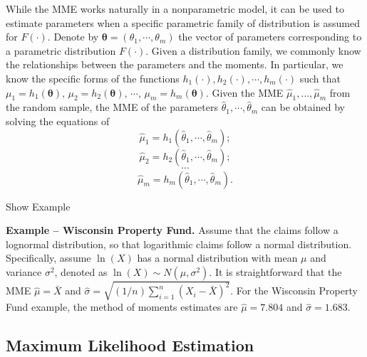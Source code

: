 \documentclass[]{book}
\theoremstyle{definition}
\theoremstyle{definition}
\theoremstyle{definition}
\theoremstyle{remark}
\begin{document}
While the MME works naturally in a nonparametric model, it can be used
to estimate parameters when a specific parametric family of distribution
is assumed for \(F(\cdot)\). Denote by
\(\boldsymbol{\theta}=(\theta_1,\cdots,\theta_m)\) the vector of
parameters corresponding to a parametric distribution \(F(\cdot)\).
Given a distribution family, we commonly know the relationships between
the parameters and the moments. In particular, we know the specific
forms of the functions \(h_1(\cdot),h_2(\cdot),\cdots,h_m(\cdot)\) such
that
\(\mu_1=h_1(\boldsymbol{\theta}),\,\mu_2=h_2(\boldsymbol{\theta}),\,\cdots,\,\mu_m=h_m(\boldsymbol{\theta})\).
Given the MME \(\hat{\mu}_1, \ldots, \hat{\mu}_m\) from the random
sample, the MME of the parameters
\(\hat{\theta}_1,\cdots,\hat{\theta}_m\) can be obtained by solving the
equations of \[\hat{\mu}_1=h_1(\hat{\theta}_1,\cdots,\hat{\theta}_m);\]
\[\hat{\mu}_2=h_2(\hat{\theta}_1,\cdots,\hat{\theta}_m);\] \[\cdots\]
\[\hat{\mu}_m=h_m(\hat{\theta}_1,\cdots,\hat{\theta}_m).\]

Show Example

\hypertarget{EXM:S1:MME}{}
\textbf{Example -- Wisconsin Property Fund.} Assume that the claims
follow a lognormal distribution, so that logarithmic claims follow a
normal distribution. Specifically, assume \(\ln(X)\) has a normal
distribution with mean \(\mu\) and variance \(\sigma^2\), denoted as
\(\ln(X) \sim N(\mu, \sigma^2)\). It is straightforward that the MME
\(\hat{\mu}=\bar{X}\) and
\(\hat{\sigma}=\sqrt{(1/n)\sum_{i=1}^n(X_i-\bar{X})^2}\). For the
Wisconsin Property Fund example, the method of moments estimates are
\(\hat{\mu} =7.804\) and \(\hat{\sigma} = 1.683\).

\subsection{Maximum Likelihood
Estimation}\label{maximum-likelihood-estimation-1}
\end{document}
